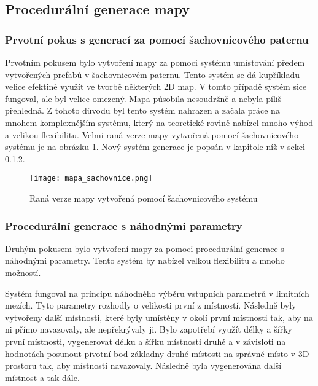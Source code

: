 \subsection{Procedurální generace mapy}

\subsubsection{Prvotní pokus s generací za pomocí šachovnicového paternu}
Prvotním pokusem bylo vytvoření mapy za pomoci systému umísťování předem vytvořených prefabů v šachovnicovém paternu. Tento systém se dá kupříkladu velice efektině využít ve tvorbě některých 2D map. V tomto případě systém sice fungoval, ale byl velice omezený. Mapa působila nesoudržně a nebyla píliš přehledná. Z tohoto důvodu byl tento systém nahrazen a začala práce na mnohem komplexnějším systému, který na teoretické rovině nabízel mnoho výhod a velikou flexibilitu. Velmi raná verze mapy vytvořená pomocí šachovnicového systému je na obrázku \ref{fig:mapa_sachovnice}. Nový systém generace je popsán v kapitole níž v sekci \ref{sec:proceduralni_generace_mapy}.

\begin{figure}[ht]
    \texttt{[image: mapa\_sachovnice.png]}
    \centering
    \caption{Raná verze mapy vytvořená pomocí šachovnicového systému}
    \label{fig:mapa_sachovnice}
\end{figure}

\subsubsection{Procedurální generace s náhodnými parametry}
\label{sec:proceduralni_generace_mapy}

Druhým pokusem bylo vytvoření mapy za pomoci procedurální generace s náhodnými parametry. Tento systém by nabízel velkou flexibilitu a mnoho možností.

Systém fungoval na principu náhodného výběru vstupních parametrů v limitních mezích. Tyto parametry rozhodly o velikosti první z místností. Následně byly vytvořeny další místnosti, které byly umístěny v okolí první místnosti tak, aby na ni přímo navazovaly, ale nepřekrývaly ji. Bylo zapotřebí využít délky a šířky první místnosti, vygenerovat délku a šířku místnosti druhé a v závisloti na hodnotách posunout pivotní bod základny druhé místosti na správné místo v 3D prostoru tak, aby místnosti navazovaly. Následně byla vygenerována další místnost a tak dále.

